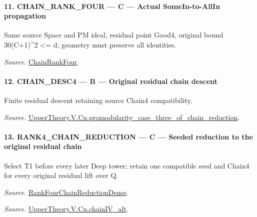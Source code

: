 \paragraph{11. CHAIN\_\allowbreak RANK\_\allowbreak FOUR — C — Actual SomeIn-to-AllIn propagation}

Same source Space and PM ideal, residual point Good4, original bound 30(C+1)\textasciicircum{}2 <= d; geometry must preserve all identities.

\emph{Source.} \href{https://github.com/CocoSgt/riemann-hypothesis-lean/blob/7cbf7a0c32fca1badf05931879a37c3f8a2b03b4/src/Development/AutomorphicArithmetic/AutomorphicVarieties/ModularityArgument/ThresholdArguments/DenseThresholdCases/PromodularityCaseThree.lean#L26-L32}{ChainRankFour}.



\paragraph{12. CHAIN\_\allowbreak DESC4 — B — Original residual chain descent}

Finite residual descent retaining source Chain4 compatibility.

\emph{Source.} \href{https://github.com/CocoSgt/riemann-hypothesis-lean/blob/7cbf7a0c32fca1badf05931879a37c3f8a2b03b4/src/Development/AutomorphicArithmetic/AutomorphicVarieties/ModularityArgument/ThresholdArguments/DenseThresholdCases/PromodularityCaseThreeOfLemmas.lean#L131-L153}{UpperTheory.V.Cu.promodularity\_\allowbreak case\_\allowbreak three\_\allowbreak of\_\allowbreak chain\_\allowbreak reduction}.



\paragraph{13. RANK4\_\allowbreak CHAIN\_\allowbreak REDUCTION — C — Seeded reduction to the original residual chain}

Select T1 before every later Deep tower; retain one compatible seed and Chain4 for every original residual lift over Q.

\emph{Source.} \href{https://github.com/CocoSgt/riemann-hypothesis-lean/blob/7cbf7a0c32fca1badf05931879a37c3f8a2b03b4/src/Development/AutomorphicArithmetic/AutomorphicVarieties/ModularityArgument/ThresholdArguments/DenseThresholdCases/PromodularityCaseThree.lean#L33-L39}{RankFourChainReductionDense}.

\emph{Source.} \href{https://github.com/CocoSgt/riemann-hypothesis-lean/blob/7cbf7a0c32fca1badf05931879a37c3f8a2b03b4/src/Development/AutomorphicArithmetic/AutomorphicVarieties/ModularityArgument/ThresholdArguments/DenseThresholdCases/CuPChainIV.lean#L16-L82}{UpperTheory.V.Cu.chainIV\_\allowbreak alt}.



